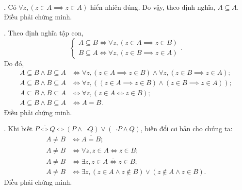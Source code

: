 \solution

\setcounter{subexercise}{1}
. Có $\forall z, (z \in A \implies z \in A)$ hiển nhiên đúng. Do vậy, theo định nghĩa, $A \subseteq A$. Điều phải chứng minh.

. Theo định nghĩa tập con,
\begin{equation*}
   \begin{cases}
      A \subseteq B \iff \forall z, (z \in A \implies z \in B) \\
      B \subseteq A \iff \forall z, (z \in B \implies z \in A)
   \end{cases}.
\end{equation*}
Do đó,
\begin{align*}
   A \subseteq B \land B \subseteq A & \iff \forall z, (z \in A \implies z \in B) \land \forall z, (z \in B \implies z \in A);    \\
   A \subseteq B \land B \subseteq A & \iff \forall z, \left( (z \in A \implies z \in B) \land (z \in B \implies z \in A)\right); \\
   A \subseteq B \land B \subseteq A & \iff \forall z, \left(z \in A \iff z \in B\right);                                         \\
   A \subseteq B \land B \subseteq A & \iff A = B.
\end{align*}
Điều phải chứng minh.

. Khi biết $\overline{P \iff Q} \iff (P \land \neg Q) \lor (\neg P \land Q)$, biến đổi cơ bản cho chúng ta:
\begin{align*}
   A \neq B & \iff \overline{A = B};                                                                                \\
   A \neq B & \iff \overline{\forall z, z \in A \iff z \in B};                                                      \\
   A \neq B & \iff \exists z, \overline{z \in A \iff z \in B};                                                      \\
   A \neq B & \iff \exists z, \left( z \in A \land z \notin B \right) \lor \left( z \notin A \land z \in B \right).
\end{align*}
Điều phải chứng minh.

